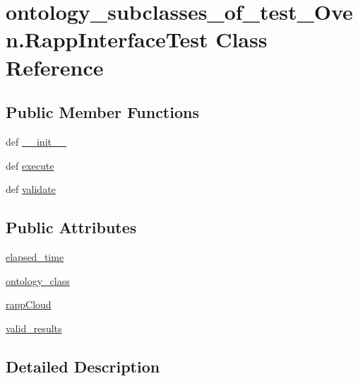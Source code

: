 \hypertarget{classontology__subclasses__of__test__Oven_1_1RappInterfaceTest}{\section{ontology\-\_\-subclasses\-\_\-of\-\_\-test\-\_\-\-Oven.\-Rapp\-Interface\-Test Class Reference}
\label{classontology__subclasses__of__test__Oven_1_1RappInterfaceTest}
}
\subsection*{Public Member Functions}
\begin{DoxyCompactItemize}
\item 
def \hyperlink{classontology__subclasses__of__test__Oven_1_1RappInterfaceTest_a6edb8e3a534ad903ae6b72003fa09cfe}{\-\_\-\-\_\-init\-\_\-\-\_\-}
\item 
def \hyperlink{classontology__subclasses__of__test__Oven_1_1RappInterfaceTest_a3c316abff8b0f75d5fc90df82814c935}{execute}
\item 
def \hyperlink{classontology__subclasses__of__test__Oven_1_1RappInterfaceTest_a0af7deca1f05b1210ef24b6ea5d05d11}{validate}
\end{DoxyCompactItemize}
\subsection*{Public Attributes}
\begin{DoxyCompactItemize}
\item 
\hyperlink{classontology__subclasses__of__test__Oven_1_1RappInterfaceTest_af4dc203a90509e0f547c08c056c4ea4b}{elapsed\-\_\-time}
\item 
\hyperlink{classontology__subclasses__of__test__Oven_1_1RappInterfaceTest_ad19c6c17db62dbd2029019289441d1b3}{ontology\-\_\-class}
\item 
\hyperlink{classontology__subclasses__of__test__Oven_1_1RappInterfaceTest_a93e5154ae04101735edb1d328be607e7}{rapp\-Cloud}
\item 
\hyperlink{classontology__subclasses__of__test__Oven_1_1RappInterfaceTest_aa1fad36c295e712111c2a4c5467e4988}{valid\-\_\-results}
\end{DoxyCompactItemize}


\subsection{Detailed Description}


